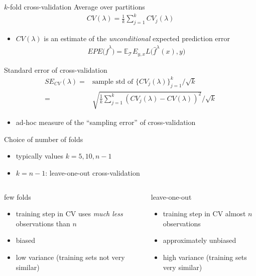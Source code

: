 \documentclass[xcolor=dvipsnames]{beamer}
\newcommand{\E}{\mathbb{E}}
\begin{document}
\begin{frame}{$k$-fold cross-validation}
Average over partitions
\begin{align*}
  CV(\lambda) = \frac{1}{k} \sum_{j=1}^k CV_j(\lambda)
\end{align*}
\begin{itemize}
  \item $CV(\lambda)$ is an estimate of the \emph{unconditional} expected prediction error
    \begin{align*}
    EPE \big(\hat{f}^{\lambda}\big) = \E_{\mathcal{T}} E_{y, x} L \big(\hat{f}^{\lambda}(x), y \big)
  \end{align*}
\end{itemize}
\end{frame}

\begin{frame}{Standard error of cross-validation}
\begin{align*}
  SE_{CV}(\lambda) =& \text{sample std of $\{CV_j(\lambda)\}_{j=1}^k$}/{\sqrt{k}}
\\
  =& \sqrt{\frac{1}{k} \sum_{j=1}^k\left( CV_j(\lambda) - CV(\lambda)\right)^2}/\sqrt{k}
\end{align*}
\begin{itemize}
  \item ad-hoc measure of the ``sampling error'' of cross-validation
\end{itemize}
\end{frame}

\begin{frame}{Choice of number of folds}
\begin{itemize}
  \item typically values $k = 5, 10, n-1$
  \item $k = n-1$: leave-one-out cross-validation
\end{itemize}
\begin{columns}[t, onlytextwidth]
        \begin{block}{few folds}
        \begin{itemize}
          \item 
          training step in CV uses \emph{much less} observations than $n$
          \item 
          biased
          \item 
          low variance (training sets not very similar)
        \end{itemize}
        \end{block}
        \begin{block}{leave-one-out}
        \begin{itemize}
          \item 
          training step in CV almost $n$ observations
          \item 
          approximately unbiased
          \item 
          high variance (training sets very similar)        
        \end{itemize}
      \end{block}
\end{columns}
\end{frame}
\end{document}
